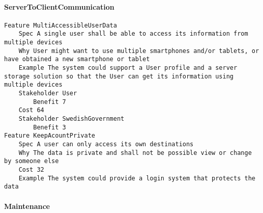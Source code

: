 				
			 \paragraph{ServerToClientCommunication}


\begin{lstlisting}
Feature MultiAccessibleUserData
	Spec A single user shall be able to access its information from multiple devices
	Why User might want to use multiple smartphones and/or tablets, or have obtained a new smartphone or tablet
	Example The system could support a User profile and a server storage solution so that the User can get its information using	 multiple devices
	Stakeholder User
		Benefit 7
	Cost 64
	Stakeholder SwedishGovernment
		Benefit 3
Feature KeepAcountPrivate
	Spec A user can only access its own destinations
	Why The data is private and shall not be possible view or change by someone else
	Cost 32
	Example The system could provide a login system that protects the data

\end{lstlisting}
		
				
			 \paragraph{Maintenance}



